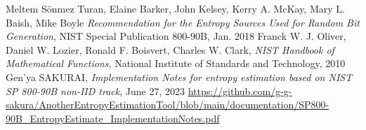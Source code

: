 ﻿\documentclass[a4paper,xelatex,english]{bxjsreport}
\begin{document}
\begin{thebibliography}{99}
Meltem S\"{o}nmez Turan,
Elaine Barker,
John Kelsey,
Kerry A. McKay,
Mary L. Baish,
Mike Boyle
\textit{Recommendation for the Entropy Sources Used for Random Bit Generation},
NIST Special Publication 800-90B, Jan. 2018
Franck W. J. Oliver,
Daniel W. Lozier,
Ronald F. Boisvert,
Charles W. Clark,
\textit{NIST Handbook of Mathematical Functions},
National Institute of Standards and Technology, 2010
Gen’ya SAKURAI,
\textit{Implementation Notes for entropy estimation based on NIST SP 800-90B non-IID track},
June 27, 2023
\url{https://github.com/g-g-sakura/AnotherEntropyEstimationTool/blob/main/documentation/SP800-90B_EntropyEstimate_ImplementationNotes.pdf}
\end{thebibliography}
\end{document}
